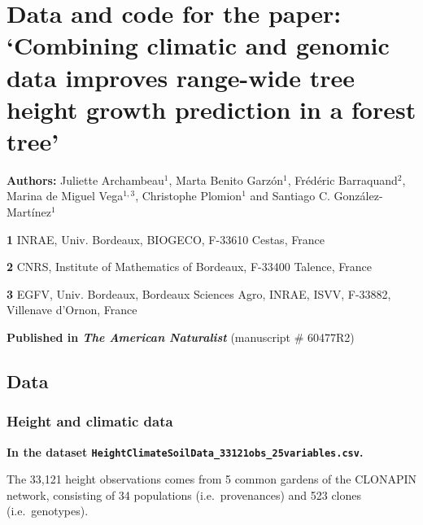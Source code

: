 \documentclass[]{article}
\author{}
\date{\vspace{-2.5em}}
\begin{document}
\section{\texorpdfstring{Data and code for the paper: `Combining
climatic and genomic data improves range-wide tree height growth
prediction in a forest
tree'}{Data and code for the paper: Combining climatic and genomic data improves range-wide tree height growth prediction in a forest tree}}\label{data-and-code-for-the-paper-combining-climatic-and-genomic-data-improves-range-wide-tree-height-growth-prediction-in-a-forest-tree}

\textbf{Authors:} Juliette Archambeau\(^1\), Marta Benito Garzón\(^1\),
Frédéric Barraquand\(^2\), Marina de Miguel Vega\(^{1,3}\), Christophe
Plomion\(^1\) and Santiago C. González-Martínez\(^1\)

\textbf{1} INRAE, Univ. Bordeaux, BIOGECO, F-33610 Cestas, France

\textbf{2} CNRS, Institute of Mathematics of Bordeaux, F-33400 Talence,
France

\textbf{3} EGFV, Univ. Bordeaux, Bordeaux Sciences Agro, INRAE, ISVV,
F-33882, Villenave d'Ornon, France

\textbf{Published in \emph{The American Naturalist} } (manuscript \#
60477R2)

\subsection{Data}\label{data}

\subsubsection{Height and climatic data}\label{height-and-climatic-data}

\textbf{In the dataset
\texttt{HeightClimateSoilData\_33121obs\_25variables.csv}.}

The 33,121 height observations comes from 5 common gardens of the
CLONAPIN network, consisting of 34 populations (i.e.~provenances) and
523 clones (i.e.~genotypes).
\end{document}
